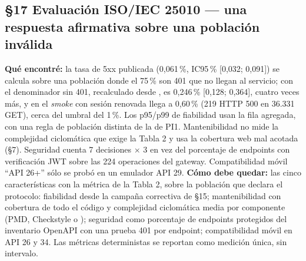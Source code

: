 \subsection*{\S17 Evaluaci\'on ISO/IEC 25010 --- una respuesta afirmativa sobre una poblaci\'on inv\'alida}
\textbf{Qu\'e encontr\'e:} la tasa de 5xx publicada (0,061\,\%, IC95\,\% [0,032; 0,091]) se calcula sobre una poblaci\'on donde el 75\,\% son 401 que no llegan al servicio; con el denominador sin 401, recalculado desde , es 0,246\,\% [0,128; 0,364], cuatro veces m\'as, y en el \emph{smoke} con sesi\'on renovada llega a 0,60\,\% (219 HTTP 500 en 36.331 GET), cerca del umbral del 1\,\%. Los p95/p99 de fiabilidad usan la fila agregada, con una regla de poblaci\'on distinta de la de PI1. Mantenibilidad no mide la complejidad ciclom\'atica que exige la Tabla 2 y usa la cobertura web mal acotada (\S7). Seguridad cuenta 7 decisiones $\times$ 3 en vez del porcentaje de endpoints con verificaci\'on JWT sobre las 224 operaciones del gateway. Compatibilidad m\'ovil ``API 26+'' s\'olo se prob\'o en un emulador API 29. \textbf{C\'omo debe quedar:} las cinco caracter\'isticas con la m\'etrica de la Tabla 2, sobre la poblaci\'on que declara el protocolo: fiabilidad desde la campa\~na correctiva de \S15; mantenibilidad con cobertura de todo el c\'odigo y complejidad ciclom\'atica media por componente (PMD, Checkstyle o ); seguridad como porcentaje de endpoints protegidos del inventario OpenAPI con una prueba 401 por endpoint; compatibilidad m\'ovil en API 26 y 34. Las m\'etricas deterministas se reportan como medici\'on \'unica, sin intervalo.

